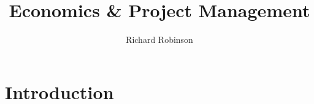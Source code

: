 \documentclass{tufte-book}
\title{Economics \& Project Management}
\author{Richard Robinson}
\begin{document}
\frontmatter
\maketitle

\setlength{\parindent}{0pt}

\mainmatter



\chapter{Introduction}
\end{document}

